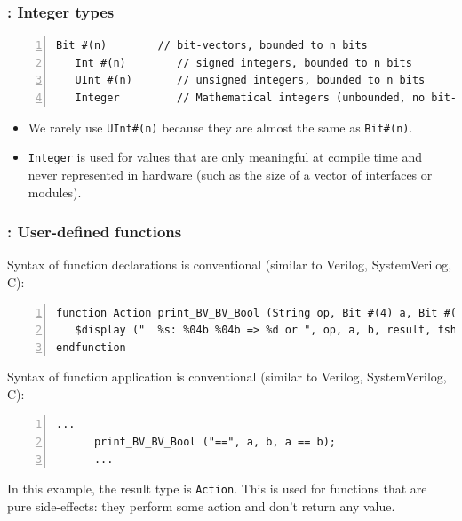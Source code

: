 \begin{frame}[fragile]
\frametitle{{\BSV}: Integer types}

\footnotesize

\begin{Verbatim}[frame=single, numbers=left]
   Bit #(n)        // bit-vectors, bounded to n bits
   Int #(n)        // signed integers, bounded to n bits
   UInt #(n)       // unsigned integers, bounded to n bits
   Integer         // Mathematical integers (unbounded, no bit-width limit)
\end{Verbatim}

\vspace{2ex}

\begin{itemize}

 \item We rarely use \verb|UInt#(n)| because they are almost the same
        as \verb|Bit#(n)|.

 \item \verb|Integer| is used for values that are only meaningful at
     compile time and never represented in hardware (such as the size
     of a vector of interfaces or modules).

\end{itemize}

\end{frame}


\begin{frame}[fragile]
\frametitle{{\BSV}: User-defined functions}

\footnotesize

Syntax of function declarations is conventional (similar to Verilog,
SystemVerilog, C):

\begin{Verbatim}[frame=single, numbers=left]
function Action print_BV_BV_Bool (String op, Bit #(4) a, Bit #(4) b, Bool result);
   $display ("  %s: %04b %04b => %d or ", op, a, b, result, fshow (result));
endfunction
\end{Verbatim}

\vspace{4ex}

Syntax of function application is conventional (similar to Verilog,
SystemVerilog, C):

\begin{Verbatim}[frame=single, numbers=left]
      ...
      print_BV_BV_Bool ("==", a, b, a == b);
      ...
\end{Verbatim}

\vspace{2ex}

In this example, the result type is {\tt Action}.  This is used for
functions that are pure side-effects: they perform some action and
don't return any value.

\end{frame}

